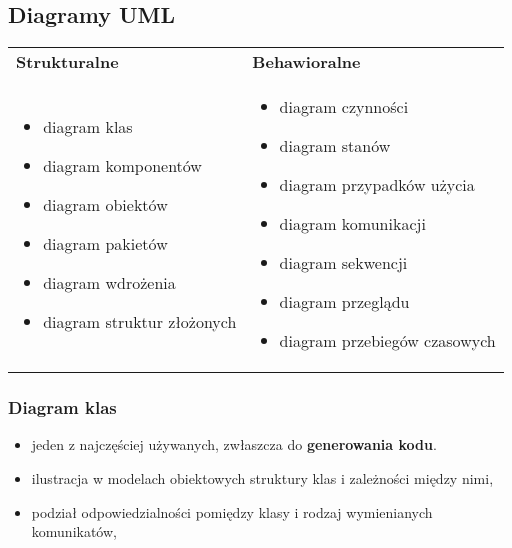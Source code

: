 \documentclass[a4paper]{article}
\begin{document}
    \subsection{Diagramy UML}
    \begin{table}[H]
        \begin{center}
            \begin{tabular}{  p{8cm} p{8cm} }
                \toprule
                \textbf{Strukturalne} & \textbf{Behawioralne}\\

                \cmidrule(r){1-1}\cmidrule(r){2-2}

                \begin{itemize}
                    \item diagram klas
                    \item diagram komponentów
                    \item diagram obiektów
                    \item diagram pakietów
                    \item diagram wdrożenia
                    \item diagram struktur złożonych
                \end{itemize}
                &
                \begin{itemize}
                    \item diagram czynności
                    \item diagram stanów
                    \item diagram przypadków użycia
                    \item diagram komunikacji
                    \item diagram sekwencji
                    \item diagram przeglądu
                    \item diagram przebiegów czasowych
                \end{itemize}
                \\

                \bottomrule
            \end{tabular}
        \end{center}
    \end{table}


    \subsubsection{Diagram klas}
    \begin{itemize}
        \item jeden z najczęściej używanych, zwłaszcza do \textbf{generowania kodu}.
        \item ilustracja w modelach obiektowych struktury klas i zależności między nimi,
        \item podział odpowiedzialności pomiędzy klasy i rodzaj wymienianych komunikatów,
    \end{itemize}
\end{document}
